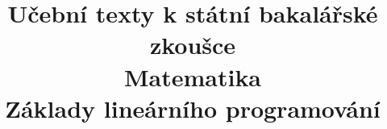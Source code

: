 \clearpage

\clearpage

\title{\LARGE Učební texty k státní bakalářské zkoušce \\ Matematika \\ Základy lineárního programování}



\maketitle

\newpage
\setcounter{section}{14}



